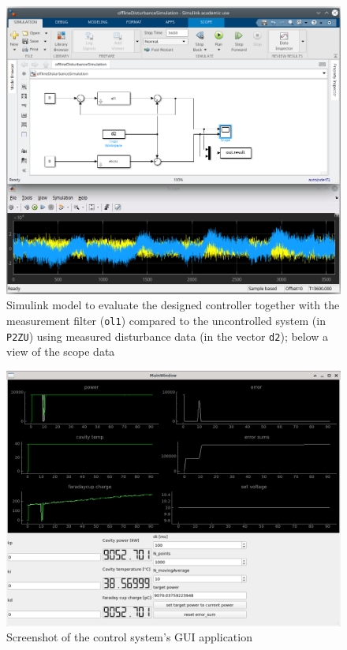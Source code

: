 \begin{figure}[H]
	\centering
	\includegraphics[width=\textwidth]{chap/Appendix/ControllerDesign/simulink}
	\caption[Simulink Model for Offline Evaluation]{Simulink model to evaluate the designed controller together with the measurement filter (\texttt{ol1}) compared to the uncontrolled system (in \texttt{P2ZU}) using measured disturbance data (in the vector \texttt{d2}); below a view of the scope data}
	\label{fig:Appendix-simuliunk}
\end{figure}

\begin{figure}[H]
	\centering
	\includegraphics[width=\textwidth]{chap/Appendix/ControllerDesign/qt}
	\caption[Control System GUI]{Screenshot of the control system's GUI application}
	\label{fig:Appendix-qt}
\end{figure}

